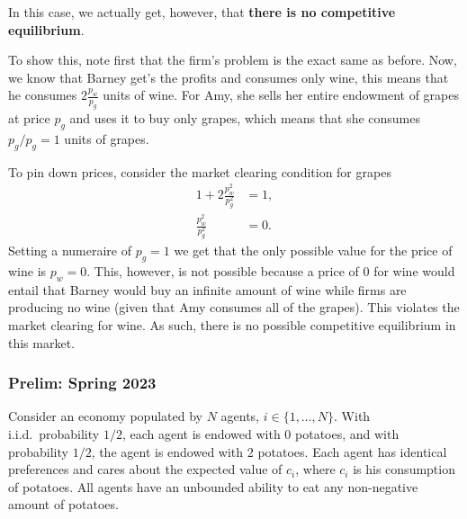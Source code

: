 \documentclass[11pt,english]{article}
\begin{document}
\begin{enumerate}[label = (\alph*)]
\begin{solution}
In this case, we actually get, however, that \textbf{there is no competitive equilibrium}.

To show this, note first that the firm's problem is the exact same as before. Now, we know that Barney get's the profits and consumes only wine, this means that he consumes $ 2\frac{p_w}{p_g}$ units of wine. For Amy, she sells her entire endowment of grapes at price $p_g$ and uses it to buy only grapes, which means that she consumes $p_g/p_g = 1$ units of grapes.

To pin down prices, consider the market clearing condition for grapes
\begin{align*}
1 + 2\frac{p_w^2}{p_g^2} &= 1,\\
\frac{p_w^2}{p_g^2} &= 0.
\end{align*} Setting a numeraire of $p_g = 1$ we get that the only possible value for the price of wine is $p_w = 0$. This, however, is not possible because a price of $0$ for wine would entail that Barney would buy an infinite amount of wine while firms are producing no wine (given that Amy consumes all of the grapes). This violates the market clearing for wine. As such, there is no possible competitive equilibrium in this market.
\end{solution}
\end{enumerate}

\subsubsection{Prelim: Spring 2023}\label{Phelan Prelim: Spring 2023}
Consider an economy populated by $N$ agents, $i \in \{1, \ldots, N\}$. With
i.i.d.\ probability $1/2$, each agent is endowed with 0 potatoes, and with
probability $1/2$, the agent is endowed with 2 potatoes. Each agent has
identical preferences and cares about the expected value of $c_i$, where $c_i$
is his consumption of potatoes. All agents have an unbounded ability to eat any
non-negative amount of potatoes.
 
\end{document}
